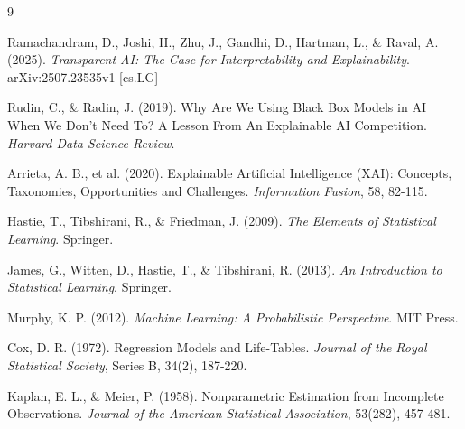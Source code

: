 \documentclass[11pt,a4paper]{article}
\begin{document}

\begin{thebibliography}{9}

Ramachandram, D., Joshi, H., Zhu, J., Gandhi, D., Hartman, L., \& Raval, A. (2025).
\textit{Transparent AI: The Case for Interpretability and Explainability}.
arXiv:2507.23535v1 [cs.LG]

Rudin, C., \& Radin, J. (2019).
Why Are We Using Black Box Models in AI When We Don't Need To? A Lesson From An Explainable AI Competition.
\textit{Harvard Data Science Review}.

Arrieta, A. B., et al. (2020).
Explainable Artificial Intelligence (XAI): Concepts, Taxonomies, Opportunities and Challenges.
\textit{Information Fusion}, 58, 82-115.

Hastie, T., Tibshirani, R., \& Friedman, J. (2009).
\textit{The Elements of Statistical Learning}.
Springer.

James, G., Witten, D., Hastie, T., \& Tibshirani, R. (2013).
\textit{An Introduction to Statistical Learning}.
Springer.

Murphy, K. P. (2012).
\textit{Machine Learning: A Probabilistic Perspective}.
MIT Press.

Cox, D. R. (1972).
Regression Models and Life-Tables.
\textit{Journal of the Royal Statistical Society}, Series B, 34(2), 187-220.

Kaplan, E. L., \& Meier, P. (1958).
Nonparametric Estimation from Incomplete Observations.
\textit{Journal of the American Statistical Association}, 53(282), 457-481.

\end{thebibliography}
\end{document}
